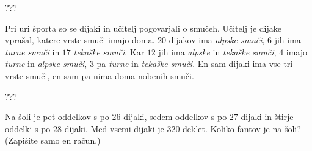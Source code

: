 \documentclass[addpoints,12pt]{exam}
\begin{document}
\begin{questions}

    \begin{solution}[9cm]
        ???
            \end{solution}


    \newpage
    \question
    Pri uri športa so se dijaki in učitelj pogovarjali o smučeh.  Učitelj je dijake vprašal, katere vrste smuči imajo doma.
    $20$ dijakov ima \textit{alpske smuči}, $6$ jih ima \textit{turne smuči} in $17$ \textit{tekaške smuči}. Kar $12$ jih ima \textit{alpske} in \textit{tekaške smuči}, $4$ imajo \textit{turne} in \textit{alpske smuči},
    $3$ pa \textit{turne} in \textit{tekaške smuči}. En sam dijaki ima vse tri vrste smuči, en sam pa nima doma nobenih smuči. 

    \begin{solution}[8cm]
        ???
            \end{solution}




    \newpage
        

    \question[3]
    Na šoli je pet oddelkov s po $26$ dijaki, sedem oddelkov s po $27$ dijaki in štirje oddelki s po $28$ dijaki. 
    Med vsemi dijaki je $320$ deklet. Koliko fantov je na šoli? (Zapišite samo en račun.)


\end{questions}
\end{document}
